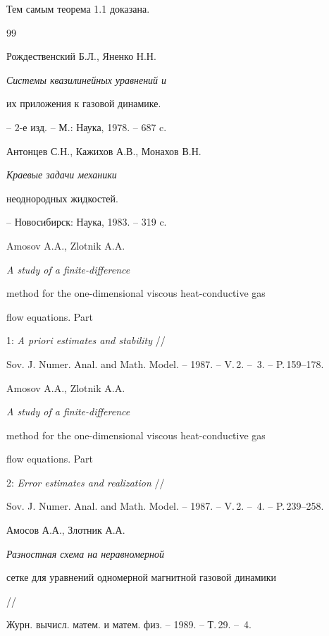 \documentclass[12pt]{article}
\theoremstyle{plain} %
\theoremstyle{definition}
\numberwithin{equation}{section}
\begin{document}
Тем самым теорема 1.1 доказана.








\begin{thebibliography}{99}







Рождественский Б.Л., Яненко Н.Н. {\em Системы квазилинейных уравнений и


их приложения к газовой динамике.} -- 2-е изд. -- М.: Наука, 1978. -- 687 c.







Антонцев С.Н., Кажихов А.В., Монахов В.Н. {\em Краевые задачи механики


неоднородных жидкостей.} -- Новосибирск: Наука, 1983. -- 319 c.







Amosov A.A., Zlotnik A.A. {\em A study of a finite-difference


method for the one-dimensional viscous heat-conductive gas


flow equations. Part} 1: {\em A priori estimates and stability} //


Sov. J. Numer. Anal. and Math. Model. -- 1987. -- V.\,2. -- \No\,3. -- P.\,159--178.







Amosov A.A., Zlotnik A.A. {\em A study of a finite-difference


method for the one-dimensional viscous heat-conductive gas


flow equations. Part} 2: {\em Error estimates and realization} //


Sov. J. Numer. Anal. and Math. Model. -- 1987. -- V.\,2. -- \No\,4. -- P.\,239--258.







Амосов А.А., Злотник А.А. {\em Разностная схема на неравномерной


сетке для уравнений одномерной магнитной газовой динамики} //


Журн. вычисл. матем. и матем. физ. -- 1989. -- Т.\,29. -- \No\,4.



\end{thebibliography}
\end{document}
